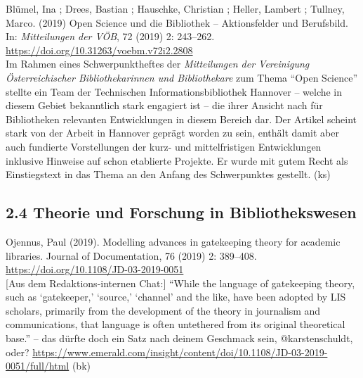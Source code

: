 \documentclass[a4paper,
fontsize=11pt,
oneside,
numbers=noperiodatend,
parskip=half-,
bibliography=totoc,
final
]{scrartcl}
\begin{document}
Blümel, Ina ; Drees, Bastian ; Hauschke, Christian ; Heller, Lambert ;
Tullney, Marco. (2019) Open Science und die Bibliothek -- Aktionsfelder
und Berufsbild. In: \emph{Mitteilungen der VÖB}, 72 (2019) 2: 243--262.
\url{https://doi.org/10.31263/voebm.v72i2.2808}\\
Im Rahmen eines Schwerpunktheftes der \emph{Mitteilungen der Vereinigung
Österreichischer Bibliothekarinnen und Bibliothekare} zum Thema ``Open
Science'' stellte ein Team der Technischen Informationsbibliothek
Hannover -- welche in diesem Gebiet bekanntlich stark engagiert ist --
die ihrer Ansicht nach für Bibliotheken relevanten Entwicklungen in
diesem Bereich dar. Der Artikel scheint stark von der Arbeit in Hannover
geprägt worden zu sein, enthält damit aber auch fundierte Vorstellungen
der kurz- und mittelfristigen Entwicklungen inklusive Hinweise auf schon
etablierte Projekte. Er wurde mit gutem Recht als Einstiegstext in das
Thema an den Anfang des Schwerpunktes gestellt. (ks)

\hypertarget{theorie-und-forschung-in-bibliothekswesen}{%
\subsection{2.4 Theorie und Forschung in
Bibliothekswesen}\label{theorie-und-forschung-in-bibliothekswesen}}

Ojennus, Paul (2019). Modelling advances in gatekeeping theory for
academic libraries. Journal of Documentation, 76 (2019) 2: 389--408.
\url{https://doi.org/10.1108/JD-03-2019-0051}\\
{[}Aus dem Redaktions-internen Chat:{]} ``While the language of
gatekeeping theory, such as `gatekeeper,' `source,' `channel' and the
like, have been adopted by LIS scholars, primarily from the development
of the theory in journalism and communications, that language is often
untethered from its original theoretical base.'' -- das dürfte doch ein
Satz nach deinem Geschmack sein, @karstenschuldt, oder?
\url{https://www.emerald.com/insight/content/doi/10.1108/JD-03-2019-0051/full/html}
(bk)
\end{document}
